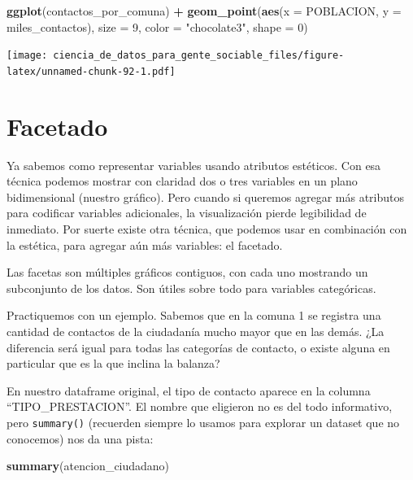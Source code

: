 \documentclass[]{book}
\newenvironment{Shaded}{\begin{snugshade}}{\end{snugshade}}
\newcommand{\KeywordTok}[1]{\textcolor[rgb]{0.13,0.29,0.53}{\textbf{#1}}}
\newcommand{\DataTypeTok}[1]{\textcolor[rgb]{0.13,0.29,0.53}{#1}}
\newcommand{\DecValTok}[1]{\textcolor[rgb]{0.00,0.00,0.81}{#1}}
\newcommand{\StringTok}[1]{\textcolor[rgb]{0.31,0.60,0.02}{#1}}
\newcommand{\OperatorTok}[1]{\textcolor[rgb]{0.81,0.36,0.00}{\textbf{#1}}}
\newcommand{\NormalTok}[1]{#1}
\begin{document}
\begin{Shaded}
\begin{Highlighting}[]
\KeywordTok{ggplot}\NormalTok{(contactos_por_comuna) }\OperatorTok{+}\StringTok{ }
\StringTok{    }\KeywordTok{geom_point}\NormalTok{(}\KeywordTok{aes}\NormalTok{(}\DataTypeTok{x =}\NormalTok{ POBLACION, }\DataTypeTok{y =}\NormalTok{ miles_contactos), }
               \DataTypeTok{size =} \DecValTok{9}\NormalTok{, }\DataTypeTok{color =} \StringTok{"chocolate3"}\NormalTok{, }\DataTypeTok{shape =} \DecValTok{0}\NormalTok{)}
\end{Highlighting}
\end{Shaded}

\texttt{[image: ciencia\_de\_datos\_para\_gente\_sociable\_files/figure-latex/unnamed-chunk-92-1.pdf]}

\section{Facetado}\label{facetado}

Ya sabemos como representar variables usando atributos estéticos. Con
esa técnica podemos mostrar con claridad dos o tres variables en un
plano bidimensional (nuestro gráfico). Pero cuando si queremos agregar
más atributos para codificar variables adicionales, la visualización
pierde legibilidad de inmediato. Por suerte existe otra técnica, que
podemos usar en combinación con la estética, para agregar aún más
variables: el facetado.

Las facetas son múltiples gráficos contiguos, con cada uno mostrando un
subconjunto de los datos. Son útiles sobre todo para variables
categóricas.

Practiquemos con un ejemplo. Sabemos que en la comuna 1 se registra una
cantidad de contactos de la ciudadanía mucho mayor que en las demás. ¿La
diferencia será igual para todas las categorías de contacto, o existe
alguna en particular que es la que inclina la balanza?

En nuestro dataframe original, el tipo de contacto aparece en la columna
``TIPO\_PRESTACION''. El nombre que eligieron no es del todo
informativo, pero \texttt{summary()} (recuerden siempre lo usamos para
explorar un dataset que no conocemos) nos da una pista:

\begin{Shaded}
\begin{Highlighting}[]
\KeywordTok{summary}\NormalTok{(atencion_ciudadano)}
\end{Highlighting}
\end{Shaded}
\end{document}
